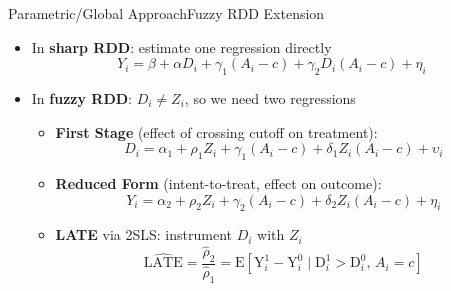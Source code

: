 \documentclass[hyperref={pdfpagelabels=false}]{beamer}
\begin{document}
\begin{frame}{Parametric/Global Approach}{Fuzzy RDD Extension}
	\begin{itemize}
		\item In \textbf{sharp RDD}: estimate one regression directly
		\begin{equation*}
			Y_i = \beta + \alpha D_i + \gamma_1(A_i - c) + \gamma_2 D_i(A_i - c) + \eta_i
		\end{equation*}
		\vspace{0.1cm}
		\item In \textbf{fuzzy RDD}: $D_i \ne Z_i$, so we need two regressions
		\vspace{0.2cm}
		\begin{itemize}
			\item \textbf{First Stage} (effect of crossing cutoff on treatment):
			\begin{equation*}
				D_i = \alpha_1 + \rho_1 Z_i + \gamma_1(A_i-c) + \delta_1 Z_i(A_i-c) + \upsilon_i
			\end{equation*}
			\vspace{0.1cm}
			\item \textbf{Reduced Form} (intent-to-treat, effect on outcome):
			\begin{equation*}
				Y_i = \alpha_2 + \rho_2 Z_i + \gamma_2(A_i-c) + \delta_2 Z_i(A_i-c) + \eta_i
			\end{equation*}
			\vspace{0.1cm}
			\item \textbf{LATE} via 2SLS: instrument $D_i$ with $Z_i$
			\begin{equation*}
				\widehat{\mathrm{LATE}} = \frac{\hat{\rho}_2}{\hat{\rho}_1} = \mathrm{E}[\mathrm{Y}^1_i - \mathrm{Y}^0_i \mid \mathrm{D}^1_i > \mathrm{D}^0_i,\, A_i = c]
			\end{equation*}
		\end{itemize}
	\end{itemize}
\end{frame}
\end{document}
